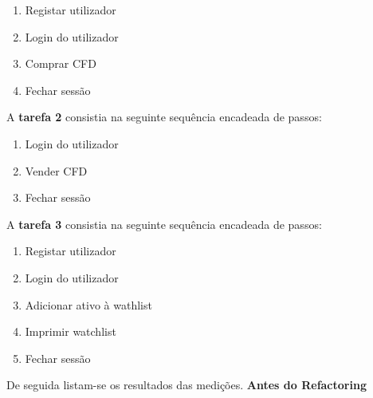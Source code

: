 \begin{enumerate}
    \item Registar utilizador
    \item Login do utilizador
    \item Comprar CFD
    \item Fechar sessão
\end{enumerate}

A \textbf{tarefa 2} consistia na seguinte sequência encadeada de passos:

\begin{enumerate}
    \item Login do utilizador
    \item Vender CFD
    \item Fechar sessão
\end{enumerate}

A \textbf{tarefa 3} consistia na seguinte sequência encadeada de passos:

\begin{enumerate}
    \item Registar utilizador
    \item Login do utilizador
    \item Adicionar ativo à wathlist
    \item Imprimir watchlist
    \item Fechar sessão
\end{enumerate}

De seguida listam-se os resultados das medições.
\vspace{5mm}
\newline\textbf{Antes do Refactoring}


